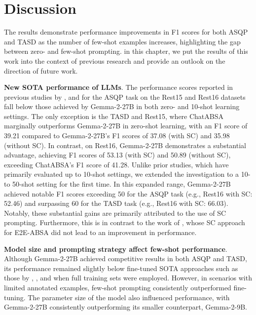 \section{Discussion}

The results demonstrate performance improvements in F1 scores for both ASQP and TASD as the number of few-shot examples increases, highlighting the gap between zero- and few-shot prompting. in this chapter, we put the results of this work into the context of previous research and provide an outlook on the direction of future work.

\textbf{New SOTA performance of LLMs}. The performance scores reported in previous studies by \citet{gou2023mvp}, \citet{zhang2024sentiment} and \citet{bai2024compound} for the ASQP task on the Rest15 and Rest16 datasets fall below those achieved by Gemma-2-27B in both zero- and 10-shot learning settings. The only exception is the TASD and Rest15, where ChatABSA \citep{bai2024compound} marginally outperforms Gemma-2-27B in zero-shot learning, with an F1 score of 39.21 compared to Gemma-2-27B’s F1 scores of 37.08 (with SC) and 35.98 (without SC). In contrast, on Rest16, Gemma-2-27B demonstrates a substantial advantage, achieving F1 scores of 53.13 (with SC) and 50.89 (without SC), exceeding ChatABSA’s F1 score of 41.28. Unlike prior studies, which have primarily evaluated up to 10-shot settings, we extended the investigation to a 10- to 50-shot setting for the first time. In this expanded range, Gemma-2-27B achieved notable F1 scores exceeding 50 for the ASQP task (e.g., Rest16 with SC: 52.46) and surpassing 60 for the TASD task (e.g., Rest16 with SC: 66.03). Notably, these substantial gains are primarily attributed to the use of SC prompting. Furthermore, this is in contrast to the work of \citet{wu2024evaluating}, whose SC approach for E2E-ABSA did not lead to an improvement in performance.

\textbf{Model size and prompting strategy affect few-shot performance}. Although Gemma-2-27B achieved competitive results in both ASQP and TASD, its performance remained slightly below fine-tuned SOTA approaches such as those by \citet{gou2023mvp}, \citet{zhang2021towards}, and \citet{hu2022improving} when full training sets were employed. However, in scenarios with limited annotated examples, few-shot prompting consistently outperformed fine-tuning. The parameter size of the model also influenced performance, with Gemma-2-27B consistently outperforming its smaller counterpart, Gemma-2-9B. 


